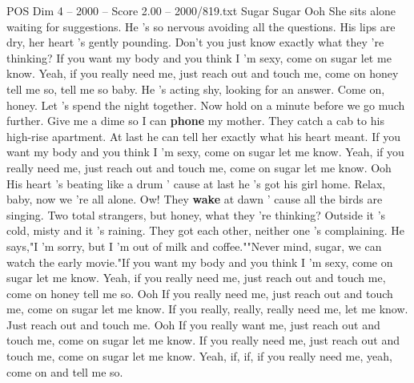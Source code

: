 \begin{textsample}{POS Dim 4 – 2000 – Score 2.00 – 2000/819.txt}  \label{ex:f4_pos_013}
Sugar Sugar Ooh She sits alone waiting for suggestions.
He 's so nervous avoiding all the questions.
His lips are dry, her heart 's gently pounding.
Don't you just know exactly what they 're thinking?
If you want my body and you think I 'm sexy, come on sugar let me know.
Yeah, if you really need me, just reach out and touch me, come on honey tell me so, tell me so baby.
He 's acting shy, looking for an answer.
Come on, honey.
Let 's spend the night together.
Now hold on a minute before we go much further.
Give me a dime so I can \textbf{phone} my mother.
They catch a cab to his high-rise apartment.
At last he can tell her exactly what his heart meant.
If you want my body and you think I 'm sexy, come on sugar let me know.
Yeah, if you really need me, just reach out and touch me, come on sugar let me know.
Ooh His heart 's beating like a drum ' cause at last he 's got his girl home.
Relax, baby, now we 're all alone.
Ow!
They \textbf{wake} at dawn ' cause all the birds are singing.
Two total strangers, but honey, what they 're thinking?
Outside it 's cold, misty and it 's raining.
They got each other, neither one 's complaining.
He says,"I 'm sorry, but I 'm out of milk and coffee.""Never mind, sugar, we can watch the early movie."If you want my body and you think I 'm sexy, come on sugar let me know.
Yeah, if you really need me, just reach out and touch me, come on honey tell me so.
Ooh If you really need me, just reach out and touch me, come on sugar let me know.
If you really, really, really need me, let me know.
Just reach out and touch me.
Ooh If you really want me, just reach out and touch me, come on sugar let me know.
If you really need me, just reach out and touch me, come on sugar let me know.
Yeah, if, if, if you really need me, yeah, come on and tell me so.

\end{textsample}
